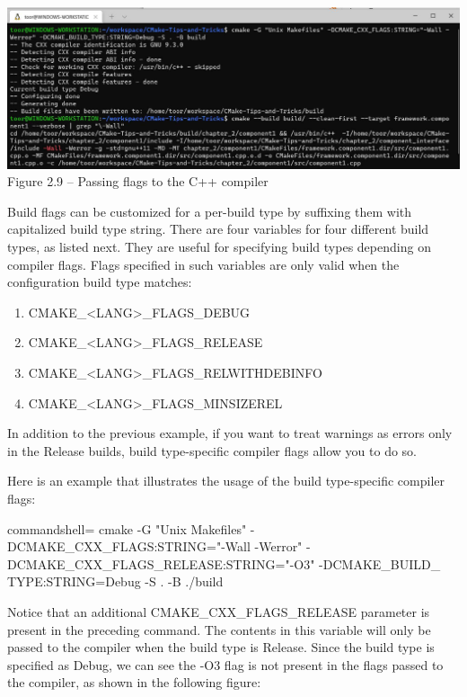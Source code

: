 \begin{center}
\includegraphics[width=1.\textwidth]{content/1/chapter2/images/9.jpg}\\
Figure 2.9 – Passing flags to the C++ compiler
\end{center}

Build flags can be customized for a per-build type by suffixing them with capitalized build type string. There are four variables for four  different build types, as listed next. They are useful for specifying build types depending on compiler flags. Flags specified in such variables are only valid when the configuration build type matches:

\begin{enumerate}
\item 
CMAKE\_<LANG>\_FLAGS\_DEBUG

\item 
CMAKE\_<LANG>\_FLAGS\_RELEASE

\item 
CMAKE\_<LANG>\_FLAGS\_RELWITHDEBINFO

\item 
CMAKE\_<LANG>\_FLAGS\_MINSIZEREL
\end{enumerate}

In addition to the previous example, if you want to treat warnings as errors only in the Release builds, build type-specific compiler flags allow you to do so.

Here is an example that illustrates the usage of the build type-specific compiler flags:

\begin{tcblisting}{commandshell={}}
cmake -G "Unix Makefiles" -DCMAKE_CXX_FLAGS:STRING="-Wall
  -Werror" -DCMAKE_CXX_FLAGS_RELEASE:STRING="-O3" -DCMAKE_BUILD_
  TYPE:STRING=Debug -S . -B ./build
\end{tcblisting}

Notice that an additional CMAKE\_CXX\_FLAGS\_RELEASE parameter is present in the preceding command. The contents in this variable will only be passed to the compiler when the build type is Release. Since the build type is specified as Debug, we can see the -O3 flag is not present in the flags passed to the compiler, as shown in the following figure:

